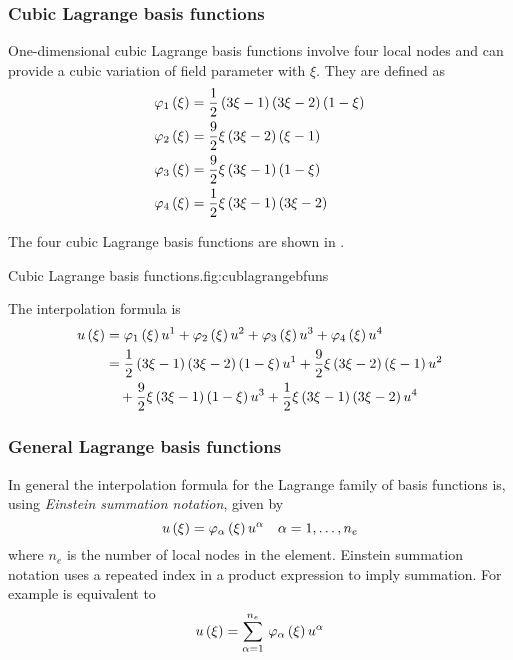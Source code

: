 \subsubsection{Cubic Lagrange basis functions}

One-dimensional cubic Lagrange basis functions involve
four local nodes and can provide a cubic variation of field parameter
with $\xi$. They are defined as
\begin{equation}
  \begin{split}
    \lbfn{1}{\xi}&=\frac12\pbrac{3\xi-1}\pbrac{3\xi-2}\pbrac{1-\xi} \\
    \lbfn{2}{\xi}&=\frac92\xi\pbrac{3\xi-2}\pbrac{\xi-1} \\
    \lbfn{3}{\xi}&=\frac92\xi\pbrac{3\xi-1}\pbrac{1-\xi} \\
    \lbfn{4}{\xi}&=\frac12\xi\pbrac{3\xi-1}\pbrac{3\xi-2}
  \end{split}
  \label{eqn:cubiclbfuns}
\end{equation}

The four \onedal cubic Lagrange basis functions are shown in .

{Cubic Lagrange basis functions.}{fig:cublagrangebfuns}

The interpolation formula is
\begin{equation}
  \begin{split}
     u\left( \xi \right) &=   \varphi_{1} \left( \xi \right)   {u}^{1} +   \varphi_{2} \left( \xi \right)   {u}^{2} +
       \varphi_{3} \left( \xi \right)   {u}^{3} +   \varphi_{4} \left( \xi \right)   {u}^{4} \\
    &=\frac12\left( 3\xi-1 \right)\left( 3\xi-2 \right)\left( 1-\xi \right) {u}^{1} +
    \frac92\xi\left( 3\xi-2 \right)\left( \xi-1 \right) {u}^{2}  \\
    &\quad+\frac92\xi\left( 3\xi-1 \right)\left( 1-\xi \right) {u}^{3} +
    \frac12\xi\left( 3\xi-1 \right)\left( 3\xi-2 \right) {u}^{4} 
  \end{split}
\end{equation}

\subsubsection{General Lagrange basis functions}

In general the interpolation formula for the Lagrange family of basis
functions is, using \emph{Einstein
  summation notation}, given by
\begin{equation}
  \fnof{u}{\xi}=\lbfn{\alpha}{\xi}\nodept{u}{\alpha}\quad \alpha=1,\ldots,n_{e}
  \label{eqn:lagrangeinterpolation}
\end{equation}
where $n_{e}$ is the number of local nodes in the element. Einstein summation
notation uses a repeated index in a product expression to imply summation. For
example  is equivalent to
\begin{equation}
   u\left( \xi \right) =  \displaystyle\sum_{\alpha=1}^{n_{e}} \,   \varphi_{\alpha} \left( \xi \right)   {u}^{\alpha}  
\end{equation}

